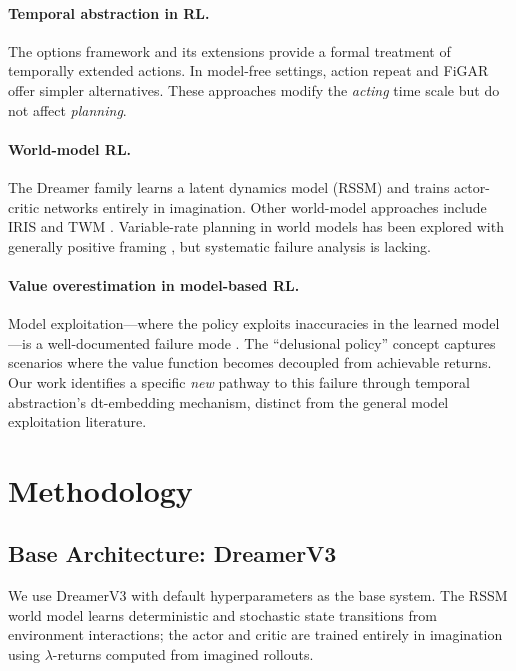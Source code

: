 \documentclass[letterpaper]{article}
\begin{document}
\paragraph{Temporal abstraction in RL.}
The options framework \citep{sutton1999options} and its extensions \citep{bacon2017option,harb2018waiting} provide a formal treatment of temporally extended actions.
In model-free settings, action repeat \citep{lakshminarayanan2017dynamic} and FiGAR \citep{sharma2017learning} offer simpler alternatives.
These approaches modify the \emph{acting} time scale but do not affect \emph{planning}.

\paragraph{World-model RL.}
The Dreamer family \citep{hafner2020dream,hafner2021mastering,hafner2023dreamerv3} learns a latent dynamics model (RSSM) and trains actor-critic networks entirely in imagination.
Other world-model approaches include IRIS \citep{micheli2023transformers} and TWM \citep{robine2023transformer}.
Variable-rate planning in world models has been explored with generally positive framing \citep{hansen2022temporal}, but systematic failure analysis is lacking.

\paragraph{Value overestimation in model-based RL.}
Model exploitation---where the policy exploits inaccuracies in the learned model---is a well-documented failure mode \citep{janner2019trust,chua2018deep}.
The ``delusional policy'' concept \citep{lu2018non} captures scenarios where the value function becomes decoupled from achievable returns.
Our work identifies a specific \emph{new} pathway to this failure through temporal abstraction's dt-embedding mechanism, distinct from the general model exploitation literature.

\section{Methodology}
\label{sec:method}

\subsection{Base Architecture: DreamerV3}

We use DreamerV3 \citep{hafner2023dreamerv3} with default hyperparameters as the base system.
The RSSM world model learns deterministic and stochastic state transitions from environment interactions; the actor and critic are trained entirely in imagination using $\lambda$-returns computed from imagined rollouts.
\end{document}
